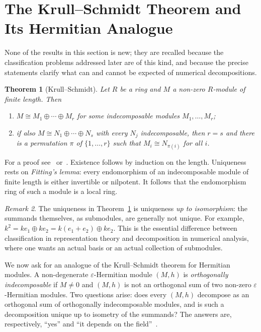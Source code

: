 \documentclass[12pt, a4paper]{report}
\theoremstyle{plain}
\newtheorem{theorem}{Theorem}[chapter]
\theoremstyle{definition}
\theoremstyle{remark}
\newtheorem{remark}[theorem]{Remark}
\theoremstyle{plain}
\begin{document}
\section{The Krull--Schmidt Theorem and Its Hermitian Analogue}
\label{sec:krull-schmidt}
None of the results in this section is new; they are recalled because the classification problems addressed later are of this kind, and because the precise statements clarify what can and cannot be expected of numerical decompositions.

\begin{theorem}[Krull--Schmidt]\label{thm:krull-schmidt}
Let $R$ be a ring and $M$ a non-zero $R$-module of finite length. Then
\begin{enumerate}
  \item $M\cong M_1\oplus\cdots\oplus M_r$ for some indecomposable modules $M_1,\dots,M_r$;
  \item if also $M\cong N_1\oplus\cdots\oplus N_s$ with every $N_j$ indecomposable, then $r=s$ and there is a permutation $\pi$ of $\{1,\dots,r\}$ such that $M_i\cong N_{\pi(i)}$ for all $i$.
\end{enumerate}
\end{theorem}
For a proof see~\cite[\S19]{Lam2001} or~\cite{AssemSimsonSkowronski2006}. Existence follows by induction on the length. Uniqueness rests on \emph{Fitting's lemma}: every endomorphism of an indecomposable module of finite length is either invertible or nilpotent. It follows that the endomorphism ring of such a module is a local ring.

\begin{remark}\label{rem:ks-uniqueness}
The uniqueness in Theorem~\ref{thm:krull-schmidt} is uniqueness \emph{up to isomorphism}: the summands themselves, as submodules, are generally not unique. For example, $k^2=k e_1\oplus k e_2=k(e_1+e_2)\oplus ke_2$. This is the essential difference between classification in representation theory and decomposition in numerical analysis, where one wants an actual basis or an actual collection of submodules.
\end{remark}

We now ask for an analogue of the Krull--Schmidt theorem for Hermitian modules. A non-degenerate $\varepsilon$-Hermitian module $(M,h)$ is \emph{orthogonally indecomposable} if $M\neq 0$ and $(M,h)$ is not an orthogonal sum of two non-zero $\varepsilon$-Hermitian modules. Two questions arise: does every $(M,h)$ decompose as an orthogonal sum of orthogonally indecomposable modules, and is such a decomposition unique up to isometry of the summands? The answers are, respectively, ``yes'' and ``it depends on the field''~\cite{QuebbemannScharlauSchulte1979,Sergeichuk1988,Lorand2020}.
\end{document}
